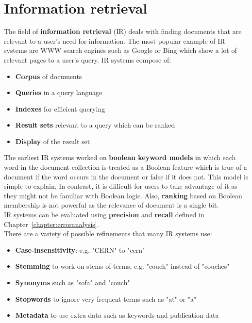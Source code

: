 \documentclass{report}
\begin{document}
\section{Information retrieval}
The field of {\bf information retrieval} (IR) deals with finding documents that are relevant to a user's need for information.
The most popular example of IR systems are WWW search engines such as Google or Bing which show a lot of relevant pages to a user's query.
IR systems compose of:
\begin{itemize}
\item {\bf Corpus} of documents
\item {\bf Queries} in a query language
\item {\bf Indexes} for efficient querying
\item {\bf Result sets} relevant to a query which can be ranked
\item {\bf Display} of the result set
\end{itemize}

The earliest IR systems worked on {\bf boolean keyword models} in which each word in the document collection is treated as a Boolean feature which is true of a document if the word occurs in the document or false if it does not.
This model is simple to explain. In contrast, it is difficult for users to take advantage of it as they might not be familiar with Boolean logic.
Also, {\bf ranking} based on Boolean membership is not powerful as the relevance of document is a single bit.
\\
IR systems can be evaluated using {\bf precision} and {\bf recall} defined in Chapter~\ref{chapter:erroranalysis}.
\\
There are a variety of possible refinements that many IR systems use:
\begin{itemize}
\item {\bf Case-insensitivity}: e.g. "CERN" to "cern"
\item {\bf Stemming} to work on stems of terms, e.g. "couch" instead of "couches"
\item {\bf Synonyms} such as "sofa" and "couch"
\item {\bf Stopwords} to ignore very frequent terms such as "at" or "a"
\item {\bf Metadata} to use extra data such as keywords and publication data
\end{itemize}
\end{document}
